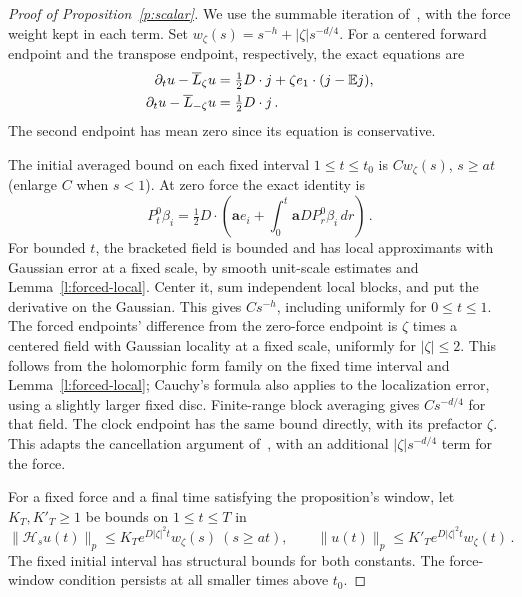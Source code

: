 \documentclass[11pt]{amsart}
\theoremstyle{definition}
\theoremstyle{remark}
\numberwithin{equation}{section}
\newcommand{\E}{\mathbb E}
\renewcommand{\a}{\mathbf a}
\begin{document}
\begin{proof}[Proof of Proposition~\ref{p:scalar}]
We use the summable iteration of~\citet[(9.48)]{AKM2019book}, with the force weight kept in each term. Set $w_\zeta(s)=s^{-h}+|\zeta|s^{-d/4}$. For a centered forward endpoint and the transpose endpoint, respectively, the exact equations are
\begin{align}\label{e:centered-equations}
 \partial_tu-\overline L_\zeta u
   &=\tfrac12D\cdot j+\zeta e_1\cdot(j-\E j),\notag\\
 \partial_tu-\overline L_{-\zeta}u&=\tfrac12D\cdot j\, .
\end{align}
The second endpoint has mean zero since its equation is conservative.

The initial averaged bound on each fixed interval $1\leq t\leq t_0$ is $Cw_\zeta(s)$, $s\geq at$ (enlarge $C$ when $s<1$). At zero force the exact identity is
\begin{equation*}
 P_t^0\beta_i=\tfrac12D\cdot
       \left(\a e_i+\int_0^t \a DP_r^0\beta_i\,dr\right)\, .
\end{equation*}
For bounded $t$, the bracketed field is bounded and has local approximants with Gaussian error at a fixed scale, by smooth unit-scale estimates and Lemma~\ref{l:forced-local}. Center it, sum independent local blocks, and put the derivative on the Gaussian. This gives $Cs^{-h}$, including uniformly for $0\leq t\leq1$. The forced endpoints' difference from the zero-force endpoint is $\zeta$ times a centered field with Gaussian locality at a fixed scale, uniformly for $|\zeta|\leq2$. This follows from the holomorphic form family on the fixed time interval and Lemma~\ref{l:forced-local}; Cauchy's formula also applies to the localization error, using a slightly larger fixed disc. Finite-range block averaging gives $Cs^{-d/4}$ for that field. The clock endpoint has the same bound directly, with its prefactor $\zeta$. This adapts the cancellation argument of~\citet[Lemma~9.7]{AKM2019book}, with an additional $|\zeta|s^{-d/4}$ term for the force.

For a fixed force and a final time satisfying the proposition's window, let $K_T,K'_T\geq1$ be bounds on $1\leq t\leq T$ in
\begin{equation*}
 \|\mathcal H_su(t)\|_p\leq K_Te^{D|\zeta|^2t}w_\zeta(s)
 \ (s\geq at),\qquad
 \|u(t)\|_p\leq K'_Te^{D|\zeta|^2t}w_\zeta(t)\, .
\end{equation*}
The fixed initial interval has structural bounds for both constants. The force-window condition persists at all smaller times above $t_0$.


\end{proof}
\end{document}
